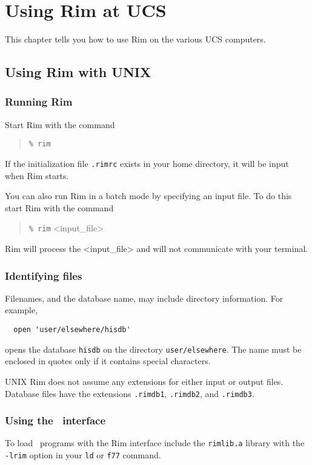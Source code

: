\documentclass[11pt,a4paper]{report}
\begin{document}
\appendix
 
\chapter{Using Rim at UCS}
%
\label{UCS-systems}
This chapter tells you how to use Rim on the various UCS
computers.
 
\section{Using Rim with UNIX}
%
 
\subsection{Running Rim}
Start Rim with the command
\begin{verse}
  \verb!% rim! 
\end{verse}
If the initialization file \verb!.rimrc! exists in your home directory, it will
be input when Rim starts.
 
You can also run Rim in a batch mode by specifying an input file.
To do this start Rim with the command
\begin{verse}
  \verb!% rim! <input\_file>
\end{verse}
Rim will process the <input\_file> and will not communicate
with your terminal.
 
\subsection{Identifying files}
%
Filenames, and the database name, may include directory information.
For example,
\begin{verbatim}
  open 'user/elsewhere/hisdb'
\end{verbatim}
opens the database \verb!hisdb! on the directory \verb!user/elsewhere!.
The name must be enclosed in quotes only if it
contains special characters.
 
UNIX Rim does not assume any extensions for either input or
output files.
Database files have the extensions \verb!.rimdb1!, \verb!.rimdb2!, and \verb!.rimdb3!.
 
 
\subsection{Using the \Fortran\ interface}
%
To load \Fortran\ programs with the Rim interface include the
\verb!rimlib.a! library with the \verb!-lrim! option
in your \verb!ld! or \verb!f77! command.
 
\end{document}
